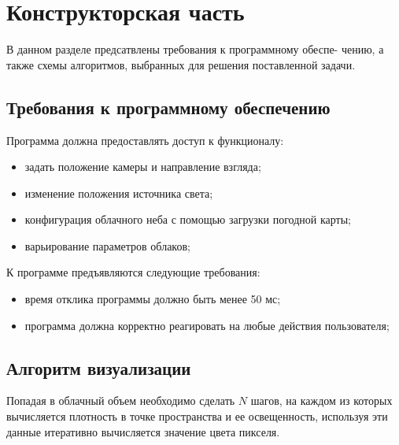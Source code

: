 \chapter{Конструкторская часть}

В данном разделе предсатвлены требования к программному обеспе-
чению, а также схемы алгоритмов, выбранных для решения поставленной
задачи.

\section{Требования к программному обеспечению}
Программа должна предоставлять доступ к функционалу:
\begin{itemize}
	\item задать положение камеры и направление взгляда;
	\item изменение положения источника света;
	\item конфигурация облачного неба с помощью загрузки погодной карты;
	\item варьирование параметров облаков;
\end{itemize}

К программе предъявляются следующие требования:
\begin{itemize}
	\item время отклика программы должно быть менее 50 мс;
	\item программа должна корректно реагировать на любые действия пользователя;
\end{itemize}

\section{Алгоритм визуализации}

Попадая в облачный объем необходимо сделать $ N $ шагов, на каждом из которых вычисляется плотность в точке пространства и ее освещенность, используя эти данные итеративно вычисляется значение цвета пикселя. 

